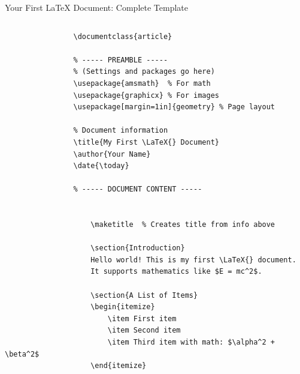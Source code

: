 \begin{frame}{Your First LaTeX Document: Complete Template}
	\begin{columns}
		\begin{column}{0.55\textwidth}
			\begin{lstlisting}[basicstyle=\small\ttfamily]
				% My first LaTeX document
				\documentclass{article}
				
				% ----- PREAMBLE -----
				% (Settings and packages go here)
				\usepackage{amsmath}  % For math
				\usepackage{graphicx} % For images
				\usepackage[margin=1in]{geometry} % Page layout
				
				% Document information
				\title{My First \LaTeX{} Document}
				\author{Your Name}
				\date{\today}
				
				% ----- DOCUMENT CONTENT -----
				
					
					\maketitle  % Creates title from info above
					
					\section{Introduction}
					Hello world! This is my first \LaTeX{} document.
					It supports mathematics like $E = mc^2$.
					
					\section{A List of Items}
					\begin{itemize}
						\item First item
						\item Second item
						\item Third item with math: $\alpha^2 + \beta^2$
					\end{itemize}
					
				
			\end{lstlisting}
		\end{column}
		

\end{columns}
\end{frame}
